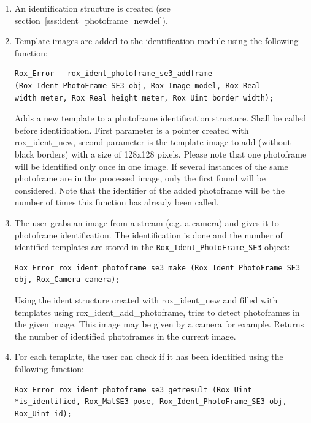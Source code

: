 \begin{enumerate}
\item An identification structure is created (see section~\ref{sss:ident_photoframe_newdel}).
\item Template images are added to the identification module using the following function:

\begin{lstlisting}
Rox_Error 	rox_ident_photoframe_se3_addframe (Rox_Ident_PhotoFrame_SE3 obj, Rox_Image model, Rox_Real width_meter, Rox_Real height_meter, Rox_Uint border_width);
\end{lstlisting}

\noindent Adds a new template to a photoframe identification
structure. Shall be called before identification. First parameter is a
pointer created with rox\_ident\_new, second parameter is the template
image to add (without black borders) with a size of 128x128 pixels.
Please note that one photoframe will be identified only once in one
image. If several instances of the same photoframe are in the
processed image, only the first found will be considered. Note that
the identifier of the added photoframe will be the number of times
this function has already been called.

\item The user grabs an image from a stream (e.g. a camera) and gives it
  to photoframe identification. The identification is done and the
  number of identified templates are stored in the \lstinline $Rox_Ident_PhotoFrame_SE3$ object:

\begin{lstlisting}
Rox_Error rox_ident_photoframe_se3_make (Rox_Ident_PhotoFrame_SE3 obj, Rox_Camera camera);
\end{lstlisting}

\noindent Using the ident structure created with rox\_ident\_new and filled
with templates using rox\_ident\_add\_photoframe, tries to detect
photoframes in the given image. This image may be given by a camera
for example. Returns the number of identified photoframes in the current
image.

\item For each template, the user can check if it has been identified using the following function:

\begin{lstlisting}
Rox_Error rox_ident_photoframe_se3_getresult (Rox_Uint *is_identified, Rox_MatSE3 pose, Rox_Ident_PhotoFrame_SE3 obj, Rox_Uint id);
\end{lstlisting}


\end{enumerate}
